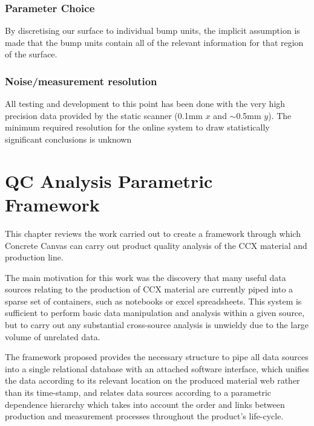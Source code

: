 \documentclass[12pt]{report}
\begin{document}
        \subsection{Parameter Choice}
            By discretising our surface to individual bump units, the implicit assumption is made that the bump units contain all of the relevant information for that region of the surface.
        \subsection{Noise/measurement resolution}
            All testing and development to this point has been done with the very high precision data provided by the static scanner (0.1mm $x$ and $\sim$0.5mm $y$). The minimum required resolution for the online system to draw statistically significant conclusions is unknown

\chapter{QC Analysis Parametric Framework}

This chapter reviews the work carried out to create a framework through which Concrete Canvas can carry out product quality analysis of the CCX material and production line. 

The main motivation for this work was the discovery that many useful data sources relating to the production of CCX material are currently piped into a sparse set of containers, such as notebooks or excel spreadsheets. This system is sufficient to perform basic data manipulation and analysis within a given source, but to carry out any substantial cross-source analysis is unwieldy due to the large volume of unrelated data. 

The framework proposed provides the necessary structure to pipe all data sources into a single relational database with an attached software interface, which unifies the data according to its relevant location on the produced material web rather than its time-stamp, and relates data sources according to a parametric dependence hierarchy which takes into account the order and links between production and measurement processes throughout the product's life-cycle. 
\end{document}
